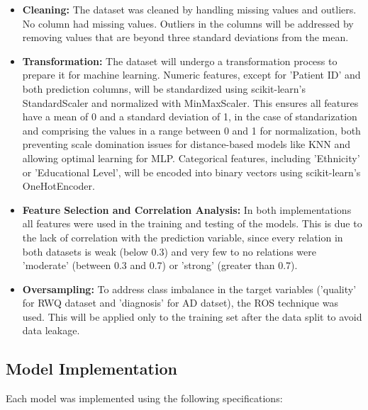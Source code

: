 \documentclass[conference]{IEEEtran}
\begin{document}
\begin{itemize}
\item \textbf{Cleaning:} The dataset was cleaned by handling missing values and outliers. No column had missing values. Outliers in the columns will be addressed by removing values that are beyond three standard deviations from the mean.
   
\item \textbf{Transformation:} The dataset will undergo a transformation process to prepare it for machine learning. Numeric features, except for 'Patient ID' and both prediction columns, will be standardized using scikit-learn's StandardScaler and normalized with MinMaxScaler. This ensures all features have a mean of 0 and a standard deviation of 1, in the case of standarization and comprising the values in a range between 0 and 1 for normalization, both preventing scale domination issues for distance-based models like KNN and allowing optimal learning for MLP. Categorical features, including 'Ethnicity' or 'Educational Level', will be encoded into binary vectors using scikit-learn's OneHotEncoder. 

\item \textbf{Feature Selection and Correlation Analysis:} In both implementations all features were used in the training and testing of the models. This is due to the lack of correlation with the prediction variable, since every relation in both datasets is weak (below 0.3) and very few to no relations were 'moderate' (between 0.3 and 0.7) or 'strong' (greater than 0.7). 

\item \textbf{Oversampling:} To address class imbalance in the target variables ('quality' for RWQ dataset and 'diagnosis' for AD datset), the ROS technique was used. This will be applied only to the training set after the data split to avoid data leakage. 
\end{itemize}

\subsection{Model Implementation}

Each model was implemented using the following specifications:
\end{document}
